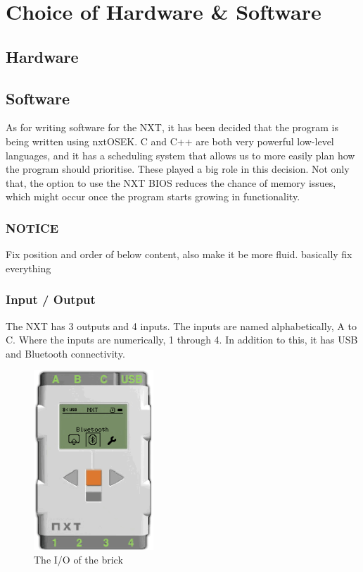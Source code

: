 \section{Choice of Hardware \& Software}

\subsection*{Hardware}


\subsection*{Software}
As for writing software for the NXT, it has been decided that the program is being written using nxtOSEK. C and C++ are both very powerful low-level languages, and it has a scheduling system that allows us to more easily plan how the program should prioritise. These played a big role in this decision. Not only that, the option to use the NXT BIOS reduces the chance of memory issues, which might occur once the program starts growing in functionality.

\subsubsection*{NOTICE}
Fix position and order of below content, also make it be more fluid. basically fix everything

\subsubsection*{Input / Output}
The NXT has 3 outputs and 4 inputs. The inputs are named alphabetically, A to C. Where the inputs are numerically, 1 through 4. In addition to this, it has USB and Bluetooth connectivity.

\begin{figure}[H]
    \label{software_nxtbrick}
    \centering
    \includegraphics[width=0.4\textwidth]{Images/Software/NXT/nxtbrick.png}
    \caption{The I/O of the brick}
\end{figure}


